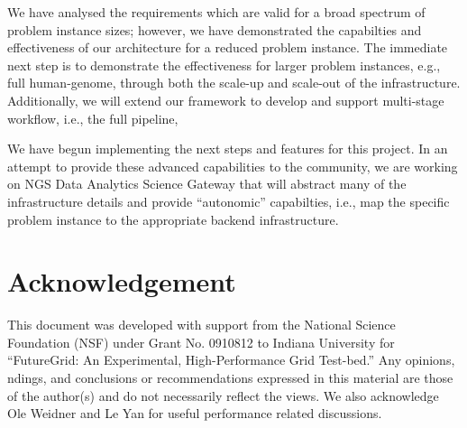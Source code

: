 \documentclass{acm_proc_article-sp}
\begin{document}
We have analysed the requirements which are valid for a broad spectrum
of problem instance sizes; however, we have demonstrated the
capabilties and effectiveness of our architecture for a reduced
problem instance. The immediate next step is to demonstrate the
effectiveness for larger problem instances, e.g., full human-genome,
through both the scale-up and scale-out of the infrastructure.
Additionally, we will extend our framework to develop and support
multi-stage workflow, i.e., the full pipeline,
 
We have begun implementing the next steps and features for this
project. In an attempt to provide these advanced capabilities to the
community, we are working on NGS Data Analytics Science Gateway that
will abstract many of the infrastructure details and provide
``autonomic'' capabilties, i.e., map the specific problem instance to
the appropriate backend infrastructure.


\section*{Acknowledgement}

This document was developed with support from the National Science
Foundation (NSF) under Grant No.  0910812 to Indiana University for
``FutureGrid: An Experimental, High-Performance Grid Test-bed.'' Any
opinions, ndings, and conclusions or recommendations expressed in this
material are those of the author(s) and do not necessarily reflect the
views. We also acknowledge Ole Weidner and Le Yan for useful
performance related discussions.



\end{document}
